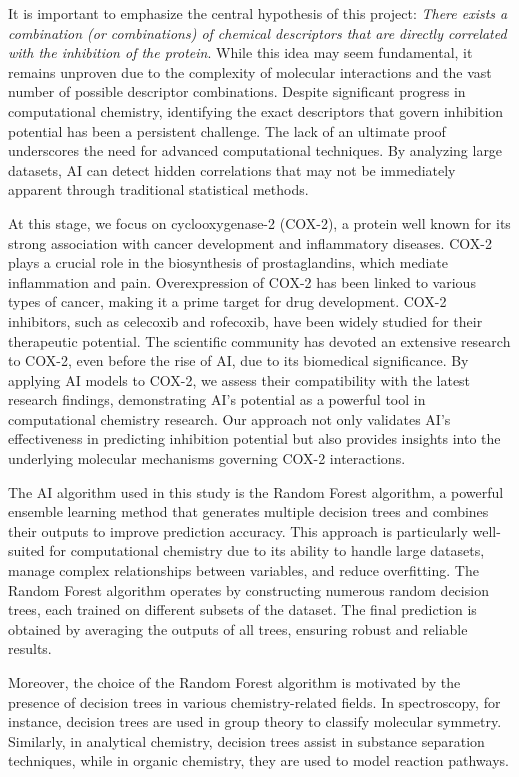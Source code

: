 \documentclass[12pt,letterpaper]{article}
\begin{document}
\begin{multicols}{2}
It is important to emphasize the central hypothesis of this project: \emph{There exists a combination (or combinations) of chemical descriptors that are directly correlated with the inhibition of the protein}. While this idea may seem fundamental, it remains unproven due to the complexity of molecular interactions and the vast number of possible descriptor combinations. Despite significant progress in computational chemistry, identifying the exact descriptors that govern inhibition potential has been a persistent challenge. The lack of an ultimate proof underscores the need for advanced computational techniques. By analyzing large datasets, AI can detect hidden correlations that may not be immediately apparent through traditional statistical methods.\par

At this stage, we focus on cyclooxygenase-2 (COX-2), a protein well known for its strong association with cancer development and inflammatory diseases. COX-2 plays a crucial role in the biosynthesis of prostaglandins, which mediate inflammation and pain. Overexpression of COX-2 has been linked to various types of cancer, making it a prime target for drug development. COX-2 inhibitors, such as celecoxib and rofecoxib, have been widely studied for their therapeutic potential. The scientific community has devoted an extensive research to COX-2, even before the rise of AI, due to its biomedical significance. By applying AI models to COX-2, we assess their compatibility with the latest research findings, demonstrating AI’s potential as a powerful tool in computational chemistry research. Our approach not only validates AI’s effectiveness in predicting inhibition potential but also provides insights into the underlying molecular mechanisms governing COX-2 interactions.\par

The AI algorithm used in this study is the Random Forest algorithm, a powerful ensemble learning method that generates multiple decision trees and combines their outputs to improve prediction accuracy. This approach is particularly well-suited for computational chemistry due to its ability to handle large datasets, manage complex relationships between variables, and reduce overfitting. The Random Forest algorithm operates by constructing numerous random decision trees, each trained on different subsets of the dataset. The final prediction is obtained by averaging the outputs of all trees, ensuring robust and reliable results.

Moreover, the choice of the Random Forest algorithm is motivated by the presence of decision trees in various chemistry-related fields. In spectroscopy, for instance, decision trees are used in group theory to classify molecular symmetry. Similarly, in analytical chemistry, decision trees assist in substance separation techniques, while in organic chemistry, they are used to model reaction pathways.\par


\end{multicols}
\end{document}
